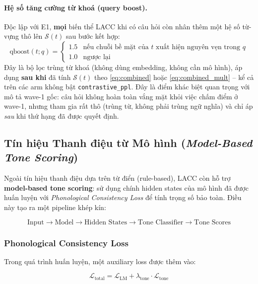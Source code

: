 \documentclass[12pt,a4paper]{article}
\newcommand{\score}[1]{\mathcal{S}(#1)}      %
\newcommand{\method}[1]{\textsc{#1}}         %
\begin{document}
\paragraph{Hệ số tăng cường từ khoá (query boost).} Độc lập với E1, \textbf{mọi} biến thể \method{LACC} khi có câu hỏi còn nhân thêm một hệ số từ-vựng thô lên $\score{t}$ sau bước kết hợp:
\begin{equation}\label{eq:query_boost}
    \text{qboost}(t; q) = \begin{cases} 1.5 & \text{nếu chuỗi bề mặt của } t \text{ xuất hiện nguyên vẹn trong } q \\ 1.0 & \text{ngược lại} \end{cases}
\end{equation}
Đây là bộ lọc trùng từ khoá (không dùng embedding, không cần mô hình), áp dụng \textbf{sau khi} đã tính $\score{t}$ theo \eqref{eq:combined} hoặc \eqref{eq:combined_mult} -- kể cả trên các arm không bật \texttt{contrastive\_ppl}. Đây là điểm khác biệt quan trọng với mô tả wave-1 gốc: câu hỏi không hoàn toàn vắng mặt khỏi việc chấm điểm ở wave-1, nhưng tham gia rất thô (trùng từ, không phải trùng ngữ nghĩa) và chỉ áp \textit{sau} khi thứ hạng đã được quyết định.

\subsection{Tín hiệu Thanh điệu từ Mô hình (\textit{Model-Based Tone Scoring})}

Ngoài tín hiệu thanh điệu dựa trên từ điển (rule-based), \method{LACC} còn hỗ trợ \textbf{model-based tone scoring}: sử dụng chính hidden states của mô hình đã được huấn luyện với \textit{Phonological Consistency Loss} để tính trọng số bảo toàn. Điều này tạo ra một pipeline khép kín:

\begin{equation}\label{eq:model_tone_pipeline}
    \text{Input} \to \text{Model} \to \text{Hidden States} \to \text{Tone Classifier} \to \text{Tone Scores}
\end{equation}

\subsubsection{Phonological Consistency Loss}

Trong quá trình huấn luyện, một auxiliary loss được thêm vào:

\begin{equation}\label{eq:phon_loss}
    \mathcal{L}_{\text{total}} = \mathcal{L}_{\text{LM}} + \lambda_{\text{tone}} \cdot \mathcal{L}_{\text{tone}}
\end{equation}
\end{document}
